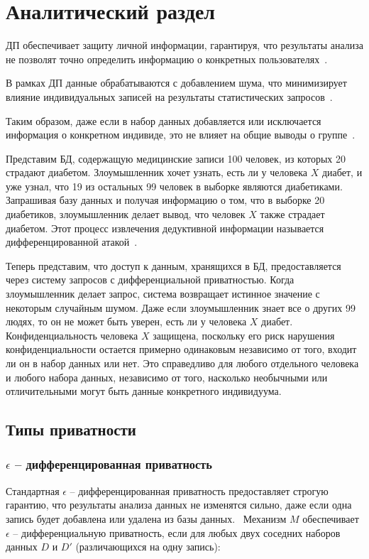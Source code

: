 \chapter{Аналитический раздел}

ДП обеспечивает защиту личной информации, гарантируя, что результаты анализа не позволят точно определить информацию о конкретных пользователях~\cite{Wood2018DifferentialPA}. 

В рамках ДП данные обрабатываются с добавлением шума, что минимизирует влияние индивидуальных записей на результаты статистических запросов~\cite{Wood2018DifferentialPA}.

Таким образом, даже если в набор данных добавляется или исключается информация о конкретном индивиде, это не влияет на общие выводы о группе~\cite{Wood2018DifferentialPA}.

Представим БД, содержащую медицинские записи 100 человек, из которых 20 страдают диабетом.
Злоумышленник хочет узнать, есть ли у человека $X$ диабет, и уже узнал, что 19 из остальных 99 человек в выборке являются диабетиками.
Запрашивая базу данных и получая информацию о том, что в выборке 20 диабетиков, злоумышленник делает вывод, что человек
$X$ также страдает диабетом.
Этот процесс извлечения дедуктивной информации называется дифференцированной атакой~\cite{harvard}.

Теперь представим, что доступ к данным, хранящихся в БД, предоставляется через систему запросов с дифференциальной приватностью.
Когда злоумышленник делает запрос, система возвращает истинное значение с некоторым случайным шумом.
Даже если злоумышленник знает все о других 99 людях, то он не может быть уверен, есть ли у человека $X$ диабет.
Конфиденциальность человека $X$ защищена, поскольку его риск нарушения конфиденциальности остается примерно одинаковым независимо от того, входит ли он в набор данных или нет.
Это справедливо для любого отдельного человека и любого набора данных, независимо от того, насколько необычными или отличительными могут быть данные конкретного индивидуума.
\newpage




\section{Типы приватности}

\subsection{$\epsilon$ -- дифференцированная приватность}
Стандартная $\epsilon$ -- дифференцированная приватность предоставляет строгую гарантию, что результаты анализа данных не изменятся сильно, даже если одна запись будет добавлена или удалена из базы данных.~\cite{main}
Механизм $M$ обеспечивает $\epsilon$ -- дифференциальную приватность, если для любых двух соседних наборов данных $D$ и $D'$ (различающихся на одну запись):


